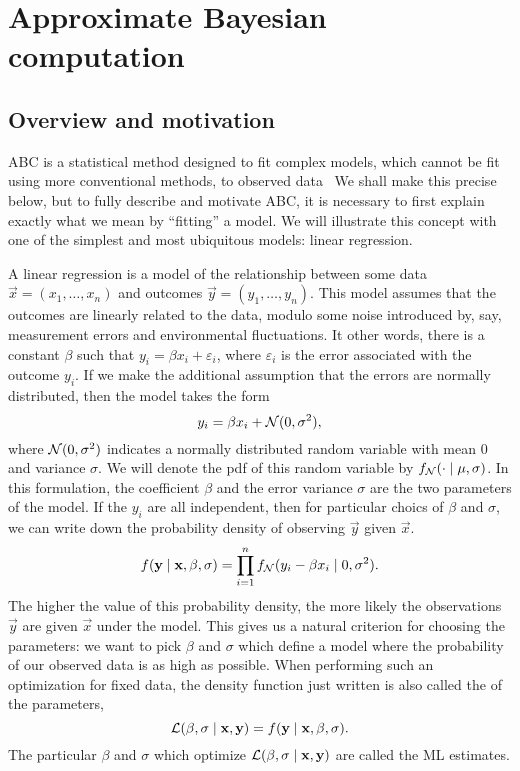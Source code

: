 \section{Approximate Bayesian computation}

\subsection{Overview and motivation}

\Gls{ABC} is a statistical method designed to fit complex models, which cannot
be fit using more conventional methods, to observed
data~\autocite{marin2012approximate, sunnaker2013approximate,
beaumont2010approximate} We shall make this precise below, but to fully
describe and motivate \gls{ABC}, it is necessary to first explain exactly what
we mean by ``fitting'' a model. We will illustrate this concept with one of the
simplest and most ubiquitous models: linear regression.

A linear regression is a model of the relationship between some data $\vec{x} =
(x_1, \ldots, x_n)$ and outcomes $\vec{y} = (y_1, \ldots, y_n)$. This model
assumes that the outcomes are linearly related to the data, modulo some noise
introduced by, say, measurement errors and environmental fluctuations. It other
words, there is a constant $\beta$ such that $y_i = \beta x_i + \varepsilon_i$,
where $\varepsilon_i$ is the error associated with the outcome $y_i$. If we
make the additional assumption that the errors are normally distributed, then
the model takes the form
\[
  y_i = \beta x_i + \mathcal{N}(0, \sigma^2),
\]
where $\mathcal{N}(0, \sigma^2)$ indicates a normally distributed random variable with
mean 0 and variance $\sigma$. We will denote the \gls{pdf} of this random
variable by $f_{\mathcal{N}}(\cdot \mid \mu, \sigma)$. In this formulation, the
coefficient $\beta$ and the error variance $\sigma$ are the two parameters of
the model. If the $y_i$ are all independent, then for particular choics of
$\beta$ and $\sigma$, we can write down the probability density of observing
$\vec{y}$ given $\vec{x}$.
\[
  f(\mathbf{y} \mid \mathbf{x}, \beta, \sigma) = 
  \prod_{i=1}^n f_{\mathcal{N}}(y_i - \beta x_i \mid 0, \sigma^2).
\]
The higher the value of this probability density, the more likely the
observations $\vec{y}$ are given $\vec{x}$ under the model. This gives us a
natural criterion for choosing the parameters: we want to pick $\beta$ and
$\sigma$ which define a model where the probability of our observed data is as
high as possible. When performing such an optimization for fixed data, the
density function just written is also called the  of the
parameters,
\[
  \mathcal{L}(\beta, \sigma \mid \mathbf{x}, \mathbf{y}) = f(\mathbf{y} \mid \mathbf{x}, \beta, \sigma).
\]
The particular $\beta$ and $\sigma$ which optimize $\mathcal{L}(\beta, \sigma \mid
\mathbf{x}, \mathbf{y})$ are called the \gls{ML} estimates. 

